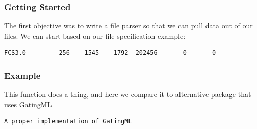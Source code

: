 \documentclass{beamer}
\begin{document}
\begin{frame}[fragile]
  \frametitle{Getting Started} The first objective was to write a file
  parser so that we can pull data out of our files. We can start based
  on our file specification\cite{spidlen2021data} example:
\begin{verbatim}
FCS3.0         256    1545    1792  202456       0       0 
\end{verbatim}
\end{frame}

\begin{frame}[fragile]
  \frametitle{Example}
  This function does a thing, and here we compare it to alternative package that uses GatingML
\begin{verbatim}
A proper implementation of GatingML
    \end{verbatim}
\end{frame}


\nocite{*}


\end{document}
